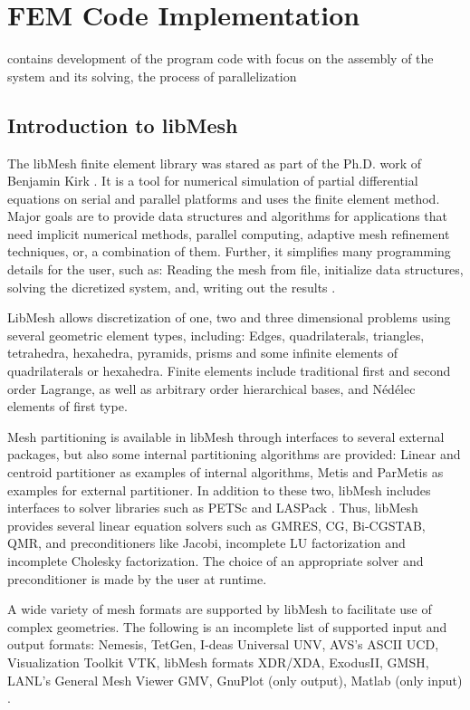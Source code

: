 \section{FEM Code Implementation}
contains development of the program code with focus on the assembly of the system and its solving, the process of parallelization %
 
 
 
 \subsection{Introduction to libMesh}
 The libMesh finite element library was stared as part of the Ph.D. work of Benjamin Kirk \cite{kirk2007adaptive}. It is a tool for numerical simulation of partial differential equations on serial and parallel platforms and uses the finite element method. Major goals are to provide data structures and algorithms for applications that need implicit numerical methods, parallel computing, adaptive mesh refinement techniques, or, a combination of them. Further, it simplifies many programming details for the user, such as: Reading the mesh from file, initialize data structures, solving the dicretized system, and, writing out the results \cite{kirk2013case}.
 
 LibMesh allows discretization of one, two and three dimensional problems using several geometric element types, including: Edges, quadrilaterals, triangles, tetrahedra, hexahedra, pyramids, prisms and some infinite elements of quadrilaterals or hexahedra. Finite elements include traditional first and second order Lagrange, as well as arbitrary order hierarchical bases, and N\'{e}d\'{e}lec elements of first type.
 
 Mesh partitioning is available in libMesh through interfaces to several external packages, but also some internal partitioning algorithms are provided: Linear and centroid partitioner as examples of internal algorithms, Metis and ParMetis \cite{karypis1998fast} as examples for external partitioner. In addition to these two, libMesh includes interfaces to solver libraries such as PETSc \cite{petsc2015url} and LASPack \cite{laspack2015url}. Thus, libMesh provides several linear equation solvers such as GMRES, CG, Bi-CGSTAB, QMR, and preconditioners like Jacobi, incomplete LU factorization and incomplete Cholesky factorization. The choice of an appropriate solver and preconditioner is made by the user at runtime.
 
 A wide variety of mesh formats are supported by libMesh to facilitate use of complex geometries. The following is an incomplete list of supported input and output formats: Nemesis, TetGen, I-deas Universal UNV, AVS's ASCII UCD, Visualization Toolkit VTK, libMesh formats XDR/XDA, ExodusII, GMSH, LANL's General Mesh Viewer GMV, GnuPlot (only output), Matlab (only input) \cite{kirk2013case}.
 
